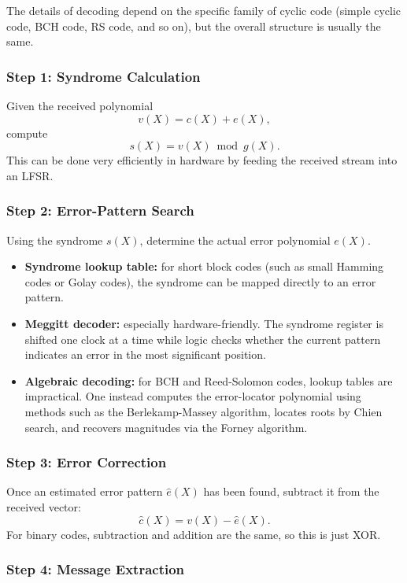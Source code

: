 \documentclass[
]{article}
\providecommand{\tightlist}{%
  \setlength{\itemsep}{0pt}\setlength{\parskip}{0pt}}
\begin{document}
The details of decoding depend on the specific family of cyclic code
(simple cyclic code, BCH code, RS code, and so on), but the overall
structure is usually the same.

\subsubsection{Step 1: Syndrome
Calculation}\label{step-1-syndrome-calculation}

Given the received polynomial \[v(X)=c(X)+e(X),\] compute
\[s(X)=v(X) \bmod g(X).\] This can be done very efficiently in hardware
by feeding the received stream into an LFSR.

\subsubsection{Step 2: Error-Pattern
Search}\label{step-2-error-pattern-search}

Using the syndrome \(s(X)\), determine the actual error polynomial
\(e(X)\).

\begin{itemize}
\tightlist
\item
  \textbf{Syndrome lookup table:} for short block codes (such as small
  Hamming codes or Golay codes), the syndrome can be mapped directly to
  an error pattern.
\item
  \textbf{Meggitt decoder:} especially hardware-friendly. The syndrome
  register is shifted one clock at a time while logic checks whether the
  current pattern indicates an error in the most significant position.
\item
  \textbf{Algebraic decoding:} for BCH and Reed-Solomon codes, lookup
  tables are impractical. One instead computes the error-locator
  polynomial using methods such as the Berlekamp-Massey algorithm,
  locates roots by Chien search, and recovers magnitudes via the Forney
  algorithm.
\end{itemize}

\subsubsection{Step 3: Error Correction}\label{step-3-error-correction}

Once an estimated error pattern \(\hat{e}(X)\) has been found, subtract
it from the received vector: \[\hat{c}(X)=v(X)-\hat{e}(X).\] For binary
codes, subtraction and addition are the same, so this is just XOR.

\subsubsection{Step 4: Message
Extraction}\label{step-4-message-extraction}
\end{document}
